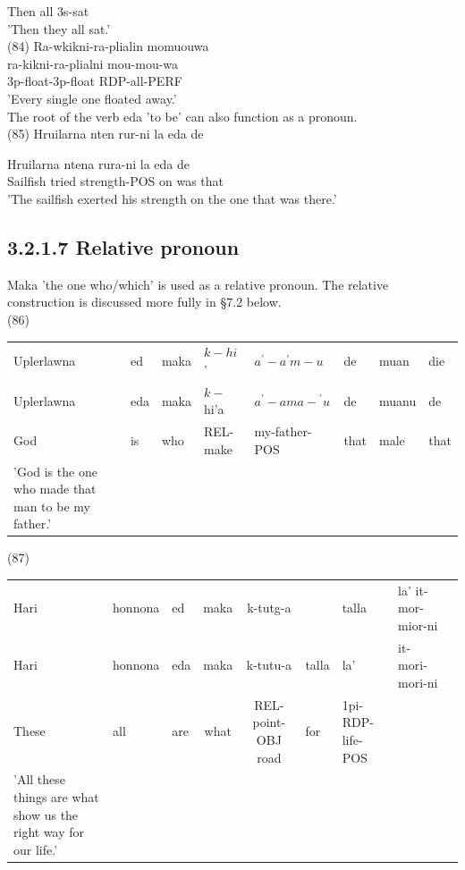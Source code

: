 \documentclass[10pt]{article}
\begin{document}
Then all 3s-sat\\
'Then they all sat.'\\
(84) Ra-wkikni-ra-plialin momuouwa\\
ra-kikni-ra-plialni mou-mou-wa\\
3p-float-3p-float RDP-all-PERF\\
'Every single one floated away.'\\
The root of the verb eda 'to be' can also function as a pronoun.\\
(85) Hruilarna nten rur-ni la eda de

Hruilarna ntena rura-ni la eda de\\
Sailfish tried strength-POS on was that\\
'The sailfish exerted his strength on the one that was there.'

\subsection*{3.2.1.7 Relative pronoun}
Maka 'the one who/which' is used as a relative pronoun. The relative construction is discussed more fully in §7.2 below.\\
(86)

\begin{center}
\begin{tabular}{llllllll}
Uplerlawna & ed & maka & \(k-h i\) ' & \(a^{\prime}-a^{\prime} m-u\) & de & muan & die \\
Uplerlawna & eda & maka & \(k-\) hi'a & \(a^{\prime}-a m a-{ }^{\prime} u\) & de & muanu & de \\
God & is & who & REL-make & my-father-POS & that & male & that \\
'God is the one who made that man to be my father.' &  &  &  &  &  &  &  \\
\end{tabular}
\end{center}

(87)

\begin{center}
\begin{tabular}{lllccllll}
Hari & honnona & ed & maka & k-tutg-a &  & talla & la' it-mor-mior-ni \\
Hari & honnona & eda & maka & k-tutu-a & talla & la' & it-mori-mori-ni \\
These & all & are & what & REL-point-OBJ road & for & 1pi-RDP-life-POS &  \\
'All these things are what show us the right way for our life.' &  &  &  &  &  &  &  \\
\end{tabular}
\end{center}
\end{document}
